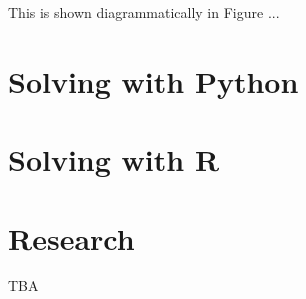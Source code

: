This is shown diagrammatically in Figure ... %
\section{Solving with Python}\label{sec:solving-with-python}

\section{Solving with R}\label{sec:solving-with-R}

\section{Research}\label{sec:research}

TBA
